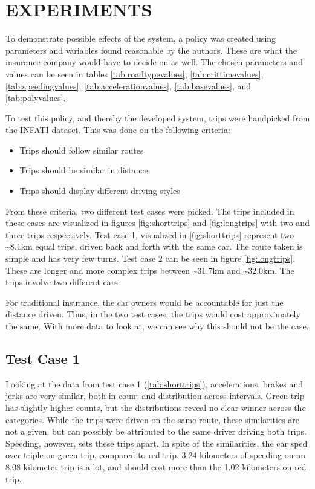 \section{EXPERIMENTS}\label{sec:expe}
To demonstrate possible effects of the system, a policy was created using parameters and variables found reasonable by the authors. These are what the insurance company would have to decide on as well. The chosen parameters and values can be seen in tables \ref{tab:roadtypevalues}, \ref{tab:crittimevalues}, \ref{tab:speedingvalues}, \ref{tab:accelerationvalues}, \ref{tab:basevalues}, and \ref{tab:polyvalues}. 

To test this policy, and thereby the developed system, trips were handpicked from the INFATI dataset. This was done on the following criteria:

\begin{itemize}
  \item Trips should follow similar routes
  \item Trips should be similar in distance
  \item Trips should display different driving styles
\end{itemize}

From these criteria, two different test cases were picked. The trips included in these cases are visualized in figures \ref{fig:shorttrips} and \ref{fig:longtrips} with two and three trips respectively. 
Test case 1, visualized in \ref{fig:shorttrips} represent two \textasciitilde8.1km equal trips, driven back and forth with the same car. The route taken is simple and has very few turns.
Test case 2 can be seen in figure \ref{fig:longtrips}. These are longer and more complex trips between  \textasciitilde31.7km and \textasciitilde32.0km. The trips involve two different cars.

For traditional insurance, the car owners would be accountable for just the distance driven. Thus, in the two test cases, the trips would cost approximately the same. With more data to look at, we can see why this should not be the case.

\subsection{Test Case 1} \label{subsec:expe1}
Looking at the data from test case 1 (\ref{tab:shorttrips}), accelerations, brakes and jerks are very similar, both in count and distribution across intervals. Green trip has slightly higher counts, but the distributions reveal no clear winner across the categories. While the trips were driven on the same route, these similarities are not a given, but can possibly be attributed to the same driver driving both trips. Speeding, however, sets these trips apart. In spite of the similarities, the car sped over triple on green trip, compared to red trip. 3.24 kilometers of speeding on an 8.08 kilometer trip is a lot, and should cost more than the 1.02 kilometers on red trip.

